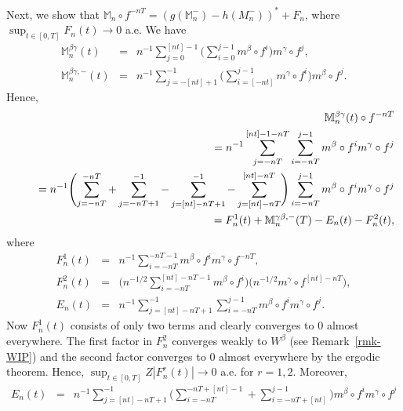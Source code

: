 \documentclass[aop,MSNbibl,seceqn,dvips]{arximspdf}
\newcommand{\BBM}{\mathbb{M}}
\begin{document}
\begin{pf}
Next, we show that
$\BBM_n\circ f^{-nT}=
 (g(\BBM_n^-)-h(M_n^-) )^*+F_n$,
where\break \mbox{$\sup_{t\in[0,T]}F_n(t)\to0$} a.e.
We have
%
\begin{eqnarray*}
\BBM_n^{\beta\gamma}(t) & =&n^{-1}\sum
_{j=0}^{[nt]-1} \Biggl(\sum_{i=0}^{j-1}m^\beta
\circ f^i \Biggr) m^\gamma\circ f^j,
\\
\BBM_n^{\beta\gamma,-}(t) & =&n^{-1}\sum
_{j=-[nt]+1}^{-1} \Biggl(\sum_{i=[-nt]}^{j-1}m^\gamma
\circ f^i \Biggr) m^\beta\circ f^j.
\end{eqnarray*}
%
Hence,
%
\begin{eqnarray}
\label{eq-IEF} &&\hspace*{-4pt}\BBM_n^{\beta\gamma}(t)\circ f^{-nT}\nonumber \\
&&\hspace*{-7pt}\qquad=
n^{-1}\sum_{j=-nT}^{[nt]-1-nT} \sum
_{i=-nT}^{j-1} m^\beta\circ
f^i m^\gamma\circ f^j
\nonumber
\\[-8pt]
\\[-8pt]
\nonumber
&&\hspace*{-7pt}\qquad = n^{-1} \Biggl(\sum_{j=-nT}^{-nT}
+\sum_{j=-nT+1}^{-1} - \sum
_{j=[nt]-nT+1}^{-1} - \sum_{j=[nt]-nT}^{[nt]-nT}
\Biggr) \sum_{i=-nT}^{j-1} m^\beta
\circ f^i m^\gamma\circ f^j
\\
&&\hspace*{-7pt}\qquad = F^1_n(t)+\BBM_n^{\gamma\beta,-}(T)-E_n(t)-F^2_n(t),\nonumber
\end{eqnarray}
%
where
%
\begin{eqnarray*}
F^1_n(t) & =&n^{-1}\sum
_{i=-nT}^{-nT-1}m^\beta\circ f^i
m^\gamma\circ f^{-nT},
\\
F^2_n(t) & = &\Biggl(n^{-{1}/2} \sum
_{i=-nT}^{[nt]-nT-1} m^\beta\circ f^i
\Biggr) \bigl(n ^{-{1}/2}m^\gamma\circ f^{[nt]-nT} \bigr),
\\
E_n(t) & = &n^{-1}\sum_{j=[nt]-nT+1}^{-1}
\sum_{i=-nT}^{j-1} m^\beta\circ
f^i m^\gamma\circ f^j.
\end{eqnarray*}
%
Now $F^1_n(t)$ consists of only two terms and clearly converges to $0$
almost everywhere.
The first factor in $F^2_n$ converges weakly to $W^\beta$ (see
Remark~\ref{rmk-WIP}) and the second factor converges to $0$ almost
everywhere by the ergodic theorem. Hence,
$\sup_{t\in[0,T]}Z|F^r_n(t)|\to0$ a.e. for $r=1,2$.
Moreover,
%
\begin{eqnarray}
\label{eq-EH}
E_n(t) & =& n^{-1}\sum
_{j=[nt]-nT+1}^{-1} \Biggl(\sum_{i=-nT}^{-nT+[nt]-1}
+\sum_{i=-nT+[nt]}^{j-1} \Biggr) m^\beta
\circ f^i m^\gamma\circ f^j
\nonumber

\end{eqnarray}
\end{pf}
\end{document}
